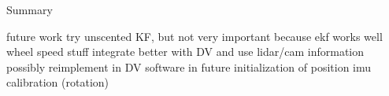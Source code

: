 Summary

future work
try unscented KF, but not very important because ekf works well
wheel speed stuff
integrate better with DV and use lidar/cam information
possibly reimplement in DV software in future
initialization of position
imu calibration (rotation)
